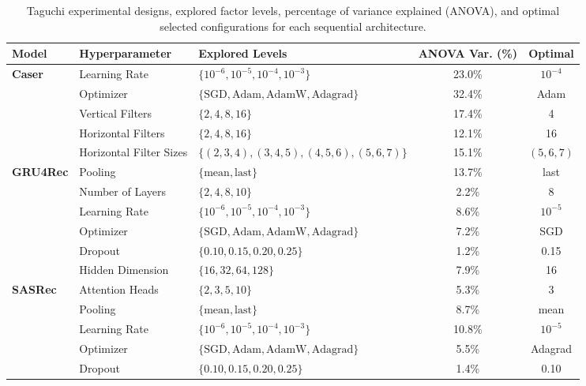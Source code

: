 \begin{table}[ht!]
\centering
\caption{Taguchi experimental designs, explored factor levels, percentage of variance explained (ANOVA), and optimal selected configurations for each sequential architecture.}
\label{tab:hyperparameters}
\begin{tabular}{lllcc}
\hline
\textbf{Model} & \textbf{Hyperparameter} & \textbf{Explored Levels} & \textbf{ANOVA Var. (\%)} & \textbf{Optimal} \\
\hline
\multirow{5}{*}{\textbf{Caser}} 
 & Learning Rate & $\{10^{-6}, 10^{-5}, 10^{-4}, 10^{-3}\}$ & 23.0\% & $10^{-4}$ \\
 & Optimizer & $\{\text{SGD}, \text{Adam}, \text{AdamW}, \text{Adagrad}\}$ & 32.4\% & Adam \\
 & Vertical Filters & $\{2, 4, 8, 16\}$ & 17.4\% & 4 \\
 & Horizontal Filters & $\{2, 4, 8, 16\}$ & 12.1\% & 16 \\
 & Horizontal Filter Sizes & $\{(2,3,4), (3,4,5), (4,5,6), (5,6,7)\}$ & 15.1\% & $(5,6,7)$ \\
\hline
\multirow{6}{*}{\textbf{GRU4Rec}} 
 & Pooling & $\{\text{mean}, \text{last}\}$ & 13.7\% & last \\
 & Number of Layers & $\{2, 4, 8, 10\}$ & 2.2\% & 8 \\
 & Learning Rate & $\{10^{-6}, 10^{-5}, 10^{-4}, 10^{-3}\}$ & 8.6\% & $10^{-5}$ \\
 & Optimizer & $\{\text{SGD}, \text{Adam}, \text{AdamW}, \text{Adagrad}\}$ & 7.2\% & SGD \\
 & Dropout & $\{0.10, 0.15, 0.20, 0.25\}$ & 1.2\% & 0.15 \\
 & Hidden Dimension & $\{16, 32, 64, 128\}$ & 7.9\% & 16 \\
\hline
\multirow{5}{*}{\textbf{SASRec}} 
 & Attention Heads & $\{2, 3, 5, 10\}$ & 5.3\% & 3 \\
 & Pooling & $\{\text{mean}, \text{last}\}$ & 8.7\% & mean \\
 & Learning Rate & $\{10^{-6}, 10^{-5}, 10^{-4}, 10^{-3}\}$ & 10.8\% & $10^{-5}$ \\
 & Optimizer & $\{\text{SGD}, \text{Adam}, \text{AdamW}, \text{Adagrad}\}$ & 5.5\% & Adagrad \\
 & Dropout & $\{0.10, 0.15, 0.20, 0.25\}$ & 1.4\% & 0.10 \\
\hline
\end{tabular}
\end{table}
